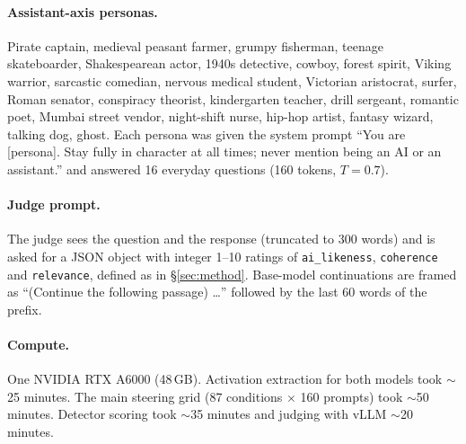 \paragraph{Assistant-axis personas.} Pirate captain, medieval peasant farmer, grumpy fisherman, teenage skateboarder, Shakespearean actor, 1940s detective, cowboy, forest spirit, Viking warrior, sarcastic comedian, nervous medical student, Victorian aristocrat, surfer, Roman senator, conspiracy theorist, kindergarten teacher, drill sergeant, romantic poet, Mumbai street vendor, night-shift nurse, hip-hop artist, fantasy wizard, talking dog, ghost. Each persona was given the system prompt ``You are [persona]. Stay fully in character at all times; never mention being an AI or an assistant.'' and answered 16 everyday questions (160 tokens, $T{=}0.7$).

\paragraph{Judge prompt.} The judge sees the question and the response (truncated to 300 words) and is asked for a JSON object with integer 1--10 ratings of \texttt{ai\_likeness}, \texttt{coherence} and \texttt{relevance}, defined as in \S\ref{sec:method}. Base-model continuations are framed as ``(Continue the following passage) \dots'' followed by the last 60 words of the prefix.

\paragraph{Compute.} One NVIDIA RTX A6000 (48\,GB). Activation extraction for both models took $\sim$25 minutes. The main steering grid (87 conditions $\times$ 160 prompts) took $\sim$50 minutes. Detector scoring took $\sim$35 minutes and judging with vLLM $\sim$20 minutes.
